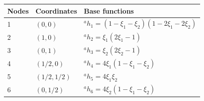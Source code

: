 \documentclass[12pt]{article}
\begin{document}
\hfill
\begin{minipage}{0.58\textwidth}
  \vfill\centering
  \begin{tabular}{l|l|l}
    Nodes & Coordinates & Base functions            \\ \hline
    1    & $(0,0)$     & ${}^ah_1  = (1-\xi_1-\xi_2)(1-2\xi_1-2\xi_2)$ \\
    2    & $(1,0)$     & $  {}^ah_2  = \xi_1(2\xi_1-1) $               \\
    3    & $(0,1)$     & $ {}^ah_3  = \xi_2(2\xi_2-1)      $           \\
    4    & $(1/2,0)$   & $ {}^ah_4 = 4\xi_1(1-\xi_1-\xi_2)       $     \\
    5    & $(1/2,1/2)$ & $ {}^ah_5  = 4\xi_1\xi_2      $               \\
    6    & $(0,1/2)$   & $ {}^ah_6 = 4\xi_2(1-\xi_1-\xi_2)      $      \\
  \end{tabular}
  \vfill
\end{minipage}
\vfill
\end{document}
